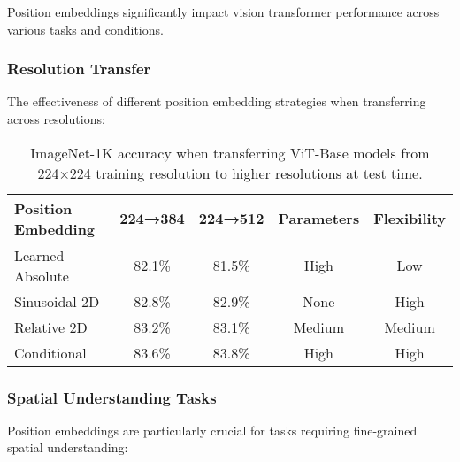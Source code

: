 Position embeddings significantly impact vision transformer performance across various tasks and conditions.

\subsubsection{Resolution Transfer}

The effectiveness of different position embedding strategies when transferring across resolutions:

\begin{table}[htbp]
\centering
\begin{tabular}{lcccc}
\toprule
\textbf{Position Embedding} & \textbf{224→384} & \textbf{224→512} & \textbf{Parameters} & \textbf{Flexibility} \\
\midrule
Learned Absolute & 82.1\% & 81.5\% & High & Low \\
Sinusoidal 2D & 82.8\% & 82.9\% & None & High \\
Relative 2D & 83.2\% & 83.1\% & Medium & Medium \\
Conditional & 83.6\% & 83.8\% & High & High \\
\bottomrule
\end{tabular}
\caption{ImageNet-1K accuracy when transferring ViT-Base models from 224×224 training resolution to higher resolutions at test time.}
\end{table}

\subsubsection{Spatial Understanding Tasks}

Position embeddings are particularly crucial for tasks requiring fine-grained spatial understanding:

